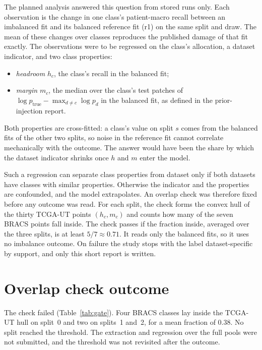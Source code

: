 \documentclass[11pt]{article}
\begin{document}
The planned analysis answered this question from stored runs only. Each observation is the change in one class's patient-macro recall between an imbalanced fit and its balanced reference fit (r1) on the same split and draw. The mean of these changes over classes reproduces the published damage of that fit exactly. The observations were to be regressed on the class's allocation, a dataset indicator, and two class properties:
\begin{itemize}
  \item \emph{headroom} $h_c$, the class's recall in the balanced fit;
  \item \emph{margin} $m_c$, the median over the class's test patches of $\log p_{\text{true}} - \max_{d \neq c} \log p_d$ in the balanced fit, as defined in the prior-injection report.
\end{itemize}
\noindent Both properties are cross-fitted: a class's value on split $s$ comes from the balanced fits of the other two splits, so noise in the reference fit cannot correlate mechanically with the outcome. The answer would have been the share by which the dataset indicator shrinks once $h$ and $m$ enter the model.

Such a regression can separate class properties from dataset only if both datasets have classes with similar properties. Otherwise the indicator and the properties are confounded, and the model extrapolates. An overlap check was therefore fixed before any outcome was read. For each split, the check forms the convex hull of the thirty TCGA-UT points $(h_c, m_c)$ and counts how many of the seven BRACS points fall inside. The check passes if the fraction inside, averaged over the three splits, is at least $5/7 \approx 0.71$. It reads only the balanced fits, so it uses no imbalance outcome. On failure the study stops with the label dataset-specific by support, and only this short report is written.

\section{Overlap check outcome}
\label{sec:results}
The check failed (Table~\ref{tab:gate}). Four BRACS classes lay inside the TCGA-UT hull on split~0 and two on splits~1 and~2, for a mean fraction of 0.38. No split reached the threshold. The extraction and regression over the full pools were not submitted, and the threshold was not revisited after the outcome.
\end{document}
